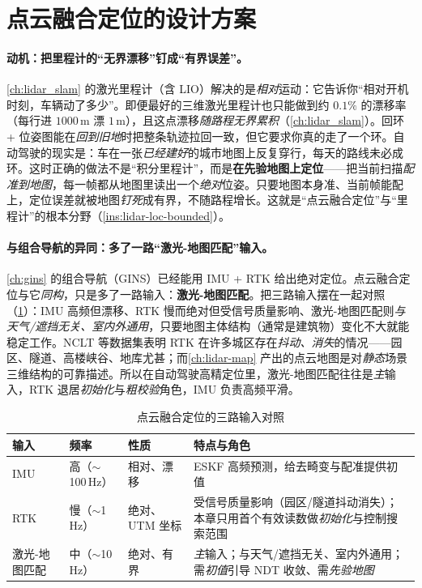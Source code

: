 \section{点云融合定位的设计方案}
\label{sec:lidar-loc-design}

\paragraph{动机：把里程计的“无界漂移”钉成“有界误差”。}
\cref{ch:lidar_slam} 的激光里程计（含 LIO）解决的是\emph{相对}运动：它告诉你“相对开机时刻，车辆动了多少”。即便最好的三维激光里程计也只能做到约 $0.1\%$ 的漂移率（每行进 $1000$\,m 漂 $1$\,m），且这点漂移\emph{随路程无界累积}（\cref{ch:lidar_slam}）。回环 + 位姿图能在\emph{回到旧地}时把整条轨迹拉回一致，但它要求你真的走了一个环。自动驾驶的现实是：车在一张\emph{已经建好}的城市地图上反复穿行，每天的路线未必成环。这时正确的做法不是“积分里程计”，而是\textbf{在先验地图上定位}——把当前扫描\emph{配准到地图}，每一帧都从地图里读出一个\emph{绝对}位姿。只要地图本身准、当前帧能配上，定位误差就被地图\emph{钉死}成有界，不随路程增长。这就是“点云融合定位”与“里程计”的根本分野（\cref{ins:lidar-loc-bounded}）。

\paragraph{与组合导航的异同：多了一路“激光-地图匹配”输入。}
\cref{ch:gins} 的组合导航（GINS）已经能用 IMU + RTK 给出绝对定位。点云融合定位与它\emph{同构}，只是多了一路输入：\textbf{激光-地图匹配}。把三路输入摆在一起对照（\cref{tab:lidar-loc-inputs}）：IMU 高频但漂移、RTK 慢而绝对但受信号质量影响、激光-地图匹配则\emph{与天气/遮挡无关、室内外通用}，只要地图主体结构（通常是建筑物）变化不大就能稳定工作。NCLT 等数据集表明 RTK 在许多城区存在\emph{抖动、消失}的情况——园区、隧道、高楼峡谷、地库尤甚；而\cref{ch:lidar-map} 产出的点云地图是对\emph{静态}场景三维结构的可靠描述。所以在自动驾驶高精定位里，激光-地图匹配往往是\emph{主}输入，RTK 退居\emph{初始化}与\emph{粗校验}角色，IMU 负责高频平滑。

\begin{table}[H]\centering\small
\caption{点云融合定位的三路输入对照}
\label{tab:lidar-loc-inputs}
\begin{tabular}{p{} p{} p{} p{}}
\toprule
输入 & 频率 & 性质 & 特点与角色 \\
\midrule
IMU & 高（$\sim$100\,Hz） & 相对、漂移 & ESKF 高频预测，给去畸变与配准提供初值 \\
RTK & 慢（$\sim$1\,Hz） & 绝对、UTM 坐标 & 受信号质量影响（园区/隧道抖动消失）；本章只用首个有效读数做\emph{初始化}与控制搜索范围 \\
激光-地图匹配 & 中（$\sim$10\,Hz） & 绝对、有界 & \emph{主}输入；与天气/遮挡无关、室内外通用；需\emph{初值}引导 NDT 收敛、需\emph{先验地图} \\
\bottomrule
\end{tabular}
\end{table}

